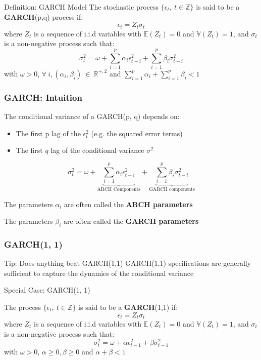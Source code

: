 \documentclass{beamer}
\newenvironment{wideitemize}{\itemize\addtolength{\itemsep}{10pt}}{\enditemize}
\begin{document}
\begin{frame}
\begin{block}{Definition: GARCH Model}
  The stochastic process $\{ \epsilon_t, \ t \in \mathbb{Z} \}$ is said to be a \textbf{GARCH}(p,q) process if:
  $$\epsilon_t = Z_t \sigma_t$$
  where $Z_t$ is a sequence of i.i.d variables with $\mathbb{E}(Z_t) = 0$ and $\mathbb{V}(Z_t) = 1$, and $\sigma_t$ is a non-negative process such that:
    $$\sigma^2_t = \omega + \sum^p_{i=1} \alpha_i \epsilon^2_{t-i} + \sum^p_{i=1} \beta_i \sigma^2_{t-i}$$
  with $\omega >0$, $\forall \ i, (\alpha_i, \beta_i) \ \in \ \mathbb{R}^{+,2}$ and $\sum^p_{i=1} \alpha_i + \sum^p_{i=1} \beta_i <1$  
\end{block}
\end{frame}


\begin{frame}
  \frametitle{GARCH: Intuition}
  \begin{wideitemize}
  \item The conditional variance of a GARCH(p, q) depends on:
    \begin{itemize}
    \item The first p lag of the $\epsilon_t^2$ (e.g. the squared error terms)
    \item The first $q$ lag of the conditional variance $\sigma^2$
    \end{itemize}
 \begin{equation*}
    \sigma^2_t = \omega + \underbrace{\sum^p_{i=1} \alpha_i \epsilon^2_{t-i}}_{\text{ARCH Components}} + \underbrace{\sum^p_{i=1} \beta_i \sigma^2_{t-i}}_{\text{GARCH components}}
  \end{equation*}   
   
  \item The parameters $\alpha_i$ are often called the \textbf{ARCH parameters}
  \item The parameters $\beta_i$ are often called the \textbf{GARCH parameters}
\end{wideitemize}
  
\end{frame}

\begin{frame}
  \frametitle{GARCH(1, 1)}

  \begin{alertblock}{Tip: Does anything beat GARCH(1,1)}
GARCH(1,1) specifications are generally sufficient to capture the dynamics of the conditional variance
  \end{alertblock}

  \medskip
  
\begin{block}{Special Case: GARCH(1, 1)}

  The process $\{ \epsilon_t, \ t \in \mathbb{Z} \}$ is said to be a \textbf{GARCH}(1,1) if:
  $$\epsilon_t = Z_t \sigma_t$$
  where $Z_t$ is a sequence of i.i.d variables with $\mathbb{E}(Z_t) = 0$ and $\mathbb{V}(Z_t) = 1$, and $\sigma_t$ is a non-negative process such that:
  $$\sigma^2_t = \omega + \alpha \epsilon^2_{t-1} + \beta \sigma^2_{t-1}$$
  with $\omega >0$, $\alpha \geq 0, \beta \geq 0$ and $\alpha + \beta <1$  
\end{block}
\end{frame}
\end{document}

